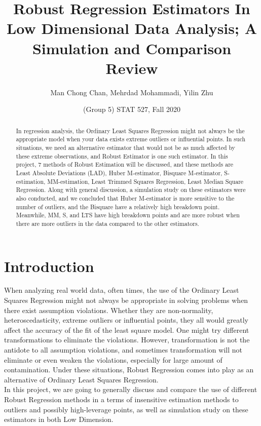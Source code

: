 \documentclass[conference]{IEEEtran}
\title{Robust Regression Estimators In Low Dimensional Data Analysis; A Simulation and Comparison Review}
\author{Man Chong Chan, Mehrdad Mohammadi, Yilin Zhu}
\date{(Group 5) STAT 527, Fall 2020}
\begin{document}
\maketitle
\begin{abstract}\:
    In regression analysis, the Ordinary Least Squares Regression might not always be the appropriate model when your data exists extreme outliers or influential points. In such situations, we need an alternative estimator that would not be as much affected by these extreme observations, and Robust Estimator is one such estimator. In this project, 7 methods of Robust Estimation will be discussed, and these methods are Least Absolute Deviations (LAD), Huber M-estimator, Bisquare M-estimator, S-estimation, MM-estimation, Least  Trimmed  Squares Regression, Least Median Square Regression. Along with general discussion, a simulation study on these estimators were also conducted, and we concluded that Huber M-estimator is more sensitive to the number of outliers, and the Bisquare have a relatively high breakdown point. Meanwhile, MM, S, and LTS have high breakdown points and are more robust when there are more outliers in the data compared to the other estimators.
\end{abstract}

\section{Introduction}
When analyzing real world data, often times, the use of the Ordinary Least Squares Regression might not always be appropriate in solving problems when there exist assumption violations. Whether they are non-normality, heteroscedasticity, extreme outliers or influential points, they all would greatly affect the accuracy of the fit of the least square model. One might try different transformations to eliminate the violations. However, transformation is not the antidote to all assumption violations, and sometimes transformation will not eliminate or even weaken the violations, especially for large amount of contamination. Under these situations, Robust Regression comes into play as an alternative of Ordinary Least Squares Regression.\\

In this project, we are going to generally discuss and compare the use of different Robust Regression methods in a terms of insensitive estimation methods to outliers and possibly high-leverage points, as well as simulation study on these estimators in both Low Dimension.
\end{document}
